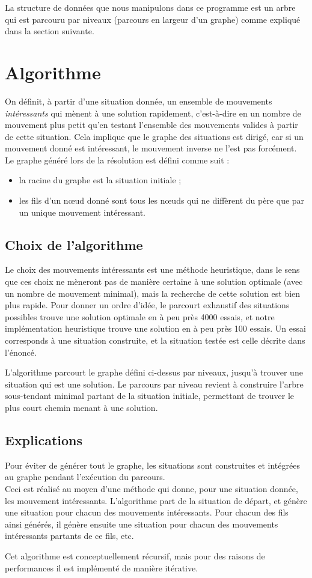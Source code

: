 \documentclass{article}
\begin{document}
		La structure de données que nous manipulons dans ce programme est un arbre qui est parcouru par niveaux (parcours en largeur d'un graphe)
		comme expliqué dans la section suivante.

\section{Algorithme}
		On définit, à partir d'une situation donnée, un ensemble de mouvements \textit{intéressants} qui mènent
		à une solution rapidement, c'est-à-dire en un nombre de mouvement plus petit qu'en testant l'ensemble des mouvements valides à
		partir de cette situation. Cela implique que le graphe des situations est dirigé, car si un mouvement donné est intéressant,
		le mouvement inverse ne l'est pas forcément. \\
		Le graphe généré lors de la résolution est défini comme suit :

		\begin{itemize}
			\item la racine du graphe est la situation initiale ;
			\item les fils d'un nœud donné sont tous les nœuds qui ne diffèrent du père que par un unique mouvement intéressant.
		\end{itemize}

	\subsection{Choix de l'algorithme}
		Le choix des mouvements intéressants est une méthode heuristique, dans le sens que ces choix ne mèneront pas de manière certaine
		à une solution optimale (avec un nombre de mouvement minimal), mais la recherche de cette solution est bien plus rapide.
		Pour donner un ordre d'idée, le parcourt exhaustif des situations possibles trouve une solution optimale en à peu près 4000 essais,
		et notre implémentation heuristique trouve une solution en à peu près 100 essais. Un essai corresponds à une situation construite,
		et la situation testée est celle décrite dans l'énoncé.

		L'algorithme parcourt le graphe défini ci-dessus par niveaux, jusqu'à trouver une situation qui est une solution.
		Le parcours par niveau revient à construire l'arbre sous-tendant minimal partant de la situation initiale,
		permettant de trouver le plus court chemin menant à une solution.

	\subsection{Explications}
		Pour éviter de générer tout le graphe, les situations sont construites et intégrées au graphe pendant l'exécution du parcours. \\
		Ceci est réalisé au moyen d'une méthode qui donne, pour une situation donnée, les mouvement intéressants.
		L'algorithme part de la situation de départ, et génère une situation pour chacun des mouvements intéressants.
		Pour chacun des fils ainsi générés, il génère ensuite une situation pour chacun des mouvements intéressants partants de ce fils, etc.

		Cet algorithme est conceptuellement récursif, mais pour des raisons de performances il est implémenté de manière itérative.
\end{document}
